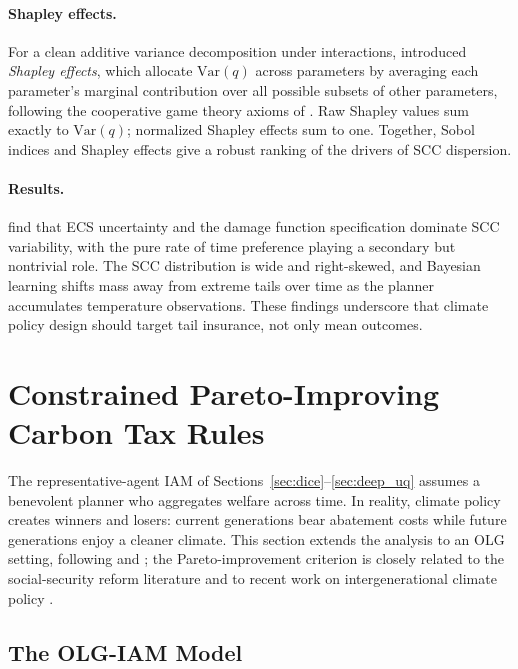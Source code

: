 \documentclass[11pt,a4paper]{report}
\begin{document}
\paragraph{Shapley effects.}
For a clean additive variance decomposition under interactions, \citet{owen2014sobol} introduced \emph{Shapley effects}, which allocate $\mathrm{Var}(q)$ across parameters by averaging each parameter's marginal contribution over all possible subsets of other parameters, following the cooperative game theory axioms of \citet{shapley1953value}.  Raw Shapley values sum exactly to $\mathrm{Var}(q)$; normalized Shapley effects sum to one.  Together, Sobol indices and Shapley effects give a robust ranking of the drivers of SCC dispersion.

\paragraph{Results.}
\citet{friedlDeep2023} find that ECS uncertainty and the damage function specification dominate SCC variability, with the pure rate of time preference playing a secondary but nontrivial role.  The SCC distribution is wide and right-skewed, and Bayesian learning shifts mass away from extreme tails over time as the planner accumulates temperature observations.  These findings underscore that climate policy design should target tail insurance, not only mean outcomes.

\section{Constrained Pareto-Improving Carbon Tax Rules}
\label{sec:pareto_carbon_tax}
\label{sec:carbon_tax}

The representative-agent IAM of Sections~\ref{sec:dice}--\ref{sec:deep_uq} assumes a benevolent planner who aggregates welfare across time.  In reality, climate policy creates winners and losers: current generations bear abatement costs while future generations enjoy a cleaner climate.  This section extends the analysis to an OLG setting, following \citet{kotlikoff2021making} and \citet{kubler2025using}; the Pareto-improvement criterion is closely related to the social-security reform literature \citep{krueger2006pareto} and to recent work on intergenerational climate policy \citep{Karp_Peri_Rezai_2024}.

\subsection{The OLG-IAM Model}
\label{sec:olg_iam}
\end{document}
